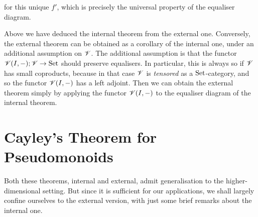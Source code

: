 \documentclass{robinthesisdraft}
\begin{document}
for this unique $f'$, which is precisely the universal property of
the equaliser diagram.
\begin{remark}
	Above we have deduced the internal theorem from the external one.
	Conversely, the external theorem can be obtained as a corollary of the internal
	one, under an additional assumption on $\mathscr{V}$. The additional assumption is
	that the functor $\mathscr{V}(I,-); \mathscr{V}\to\mathrm{Set}$ should preserve equalisers. In
	particular, this is always so if $\mathscr{V}$ has small coproducts, because in that
	case $\mathscr{V}$ is \emph{tensored} \citep[in the sense of][Section~2.7]{KellyEnriched}
	as a $\mathrm{Set}$-category, and so the functor $\mathscr{V}(I,-)$ has a left adjoint.
	Then we can obtain the external theorem simply by applying the functor
	$\mathscr{V}(I,-)$ to the equaliser diagram of the internal theorem.
\end{remark}

\section{Cayley's Theorem for Pseudomonoids}
Both these theorems, internal and external, admit generalisation to
the higher-dimensional setting. But since it is sufficient for our
applications, we shall largely confine ourselves to the external version,
with just some brief remarks about the internal one.
\end{document}
